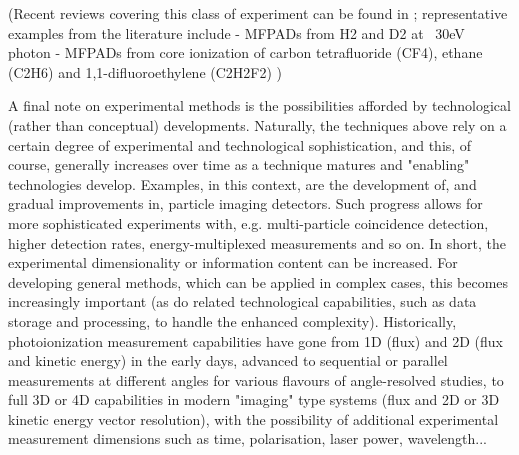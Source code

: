 (Recent reviews covering this class of experiment can be found in  \cite{Yagishita2015}; representative examples from the literature include
- MFPADs from H2 and D2 at ~30eV photon\cite{Billaud2012a}
- MFPADs from core ionization of carbon tetrafluoride (CF4), ethane (C2H6) and 1,1-difluoroethylene (C2H2F2)\cite{Menssen2016}
)

A final note on experimental methods is the possibilities afforded by technological (rather than conceptual) developments. Naturally, the techniques above rely on a certain degree of experimental and technological sophistication, and this, of course, generally increases over time as a technique matures and "enabling" technologies develop. Examples, in this context, are the development of, and gradual improvements in, particle imaging detectors. Such progress allows for more sophisticated experiments with, e.g. multi-particle coincidence detection, higher detection rates, energy-multiplexed measurements and so on. In short, the experimental dimensionality or information content can be increased. For developing general methods, which can be applied in complex cases, this becomes increasingly important (as do related technological capabilities, such as data storage and processing, to handle the enhanced complexity). Historically, photoionization measurement capabilities have gone from 1D (flux) and 2D (flux and kinetic energy) in the early days, advanced to sequential or parallel measurements at different angles for various flavours of angle-resolved studies, to full 3D or 4D capabilities in modern "imaging" type systems (flux and 2D or 3D kinetic energy vector resolution), with the possibility of additional experimental measurement dimensions such as time, polarisation, laser power, wavelength...